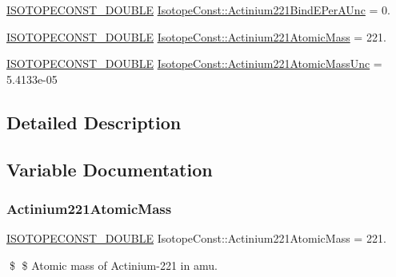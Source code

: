 \begin{DoxyCompactItemize}
\mbox{\hyperlink{group___isotope_const-_macros_ga8f45a7272ce02c0b4c65c44636ed719a}{I\+S\+O\+T\+O\+P\+E\+C\+O\+N\+S\+T\+\_\+\+D\+O\+U\+B\+LE}} \mbox{\hyperlink{group___isotope_const-_actinium-_ac221_ga4a2d3a1e79e7fda7eb9cce2489ec467a}{Isotope\+Const\+::\+Actinium221\+Bind\+E\+Per\+A\+Unc}} = 0.
\item 
\mbox{\hyperlink{group___isotope_const-_macros_ga8f45a7272ce02c0b4c65c44636ed719a}{I\+S\+O\+T\+O\+P\+E\+C\+O\+N\+S\+T\+\_\+\+D\+O\+U\+B\+LE}} \mbox{\hyperlink{group___isotope_const-_actinium-_ac221_ga7c043eea18a385c0b602c45a72aebe78}{Isotope\+Const\+::\+Actinium221\+Atomic\+Mass}} = 221.
\item 
\mbox{\hyperlink{group___isotope_const-_macros_ga8f45a7272ce02c0b4c65c44636ed719a}{I\+S\+O\+T\+O\+P\+E\+C\+O\+N\+S\+T\+\_\+\+D\+O\+U\+B\+LE}} \mbox{\hyperlink{group___isotope_const-_actinium-_ac221_ga155550dbb0ec01e9657b4fbe077ff1dc}{Isotope\+Const\+::\+Actinium221\+Atomic\+Mass\+Unc}} = 5.\+4133e-\/05
\end{DoxyCompactItemize}


\subsection{Detailed Description}


\subsection{Variable Documentation}
\mbox{\label{group___isotope_const-_actinium-_ac221_ga7c043eea18a385c0b602c45a72aebe78}} 
\subsubsection{\texorpdfstring{Actinium221\+Atomic\+Mass}{Actinium221AtomicMass}}
{\footnotesize\ttfamily \mbox{\hyperlink{group___isotope_const-_macros_ga8f45a7272ce02c0b4c65c44636ed719a}{I\+S\+O\+T\+O\+P\+E\+C\+O\+N\+S\+T\+\_\+\+D\+O\+U\+B\+LE}} Isotope\+Const\+::\+Actinium221\+Atomic\+Mass = 221.}

\$ \$ Atomic mass of Actinium-\/221 in amu. \mbox{\label{group___isotope_const-_actinium-_ac221_ga155550dbb0ec01e9657b4fbe077ff1dc}} 
